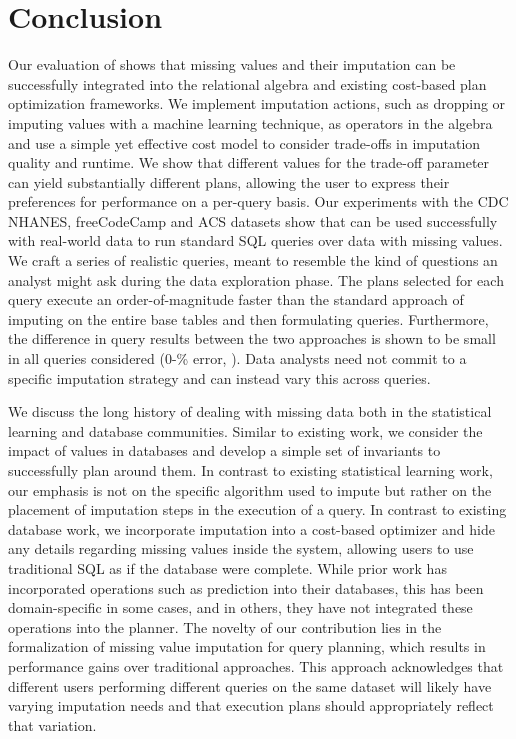 \section{Conclusion}
Our evaluation of \ProjectName{} shows that missing values and their imputation can be successfully integrated into the relational algebra and
existing cost-based plan optimization frameworks. We implement imputation actions, such as dropping or imputing values with a machine
learning technique, as operators in the algebra and use a simple yet effective cost model to consider trade-offs in 
imputation quality and runtime. We show that different values for the trade-off parameter can yield substantially
different plans, allowing the user to express their preferences for performance on a per-query basis.
Our experiments with the CDC NHANES, freeCodeCamp and ACS datasets
show that \ProjectName{} can be used successfully with real-world data to run standard SQL queries over data with missing values. 
We craft a series of realistic queries, meant to resemble the kind of questions an analyst might ask during
the data exploration phase. The plans selected for each query execute an order-of-magnitude faster than
 the standard approach of imputing on the entire base tables and
then formulating queries. Furthermore, the difference in query results between the two approaches is
shown to be small in all queries considered (0-\highsmapealphaoneexacs\% error, ). Data analysts need not commit to a specific imputation strategy and can instead
vary this across queries.

We discuss the long history of dealing with missing data both in the statistical learning and database communities.
Similar to existing work, we consider the impact of \nullv{} values in databases and develop a simple set of invariants to 
successfully plan around them. In contrast to existing statistical learning work, our emphasis is not on the specific algorithm
used to impute but rather on the placement of imputation steps in the execution of a query. In contrast to existing database work,
we incorporate imputation into a cost-based optimizer and hide any details
regarding missing values inside the system, allowing users to use traditional SQL as if the database were complete.
While prior work has incorporated operations such as prediction into their databases, this has been domain-specific
in some cases, and in others, they have not integrated these operations into the planner. The novelty
of our contribution lies in the formalization of missing value imputation for query planning, which results in performance
gains over traditional approaches. This approach acknowledges that different users performing different queries on the same
dataset will likely have varying imputation needs and that execution plans should appropriately reflect that variation.

